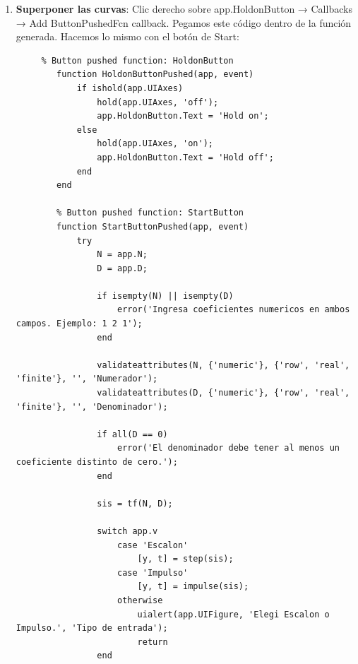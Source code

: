 \begin{enumerate}
\begin{lstlisting}
        % Value changed function: denEditField
        function denEditFieldValueChanged(app, event)
            app.D = str2num(app.denEditField.Value, Evaluation="restricted");
            disp(app.D)
        end

        % Value changed function: DropDown
        function DropDownValueChanged(app, event)
            app.v = app.DropDown.Value;
            
        end
    \end{lstlisting}
    
    \item \textbf{Superponer las curvas}: Clic derecho sobre app.HoldonButton → Callbacks → Add ButtonPushedFcn callback. Pegamos este código dentro de la función generada. Hacemos lo mismo con el botón de Start:
    
    \begin{lstlisting}
     % Button pushed function: HoldonButton
        function HoldonButtonPushed(app, event)
            if ishold(app.UIAxes)
                hold(app.UIAxes, 'off');
                app.HoldonButton.Text = 'Hold on';
            else
                hold(app.UIAxes, 'on');
                app.HoldonButton.Text = 'Hold off';
            end
        end

        % Button pushed function: StartButton
        function StartButtonPushed(app, event)
            try
                N = app.N;
                D = app.D;

                if isempty(N) || isempty(D)
                    error('Ingresa coeficientes numericos en ambos campos. Ejemplo: 1 2 1');
                end

                validateattributes(N, {'numeric'}, {'row', 'real', 'finite'}, '', 'Numerador');
                validateattributes(D, {'numeric'}, {'row', 'real', 'finite'}, '', 'Denominador');

                if all(D == 0)
                    error('El denominador debe tener al menos un coeficiente distinto de cero.');
                end

                sis = tf(N, D);

                switch app.v
                    case 'Escalon'
                        [y, t] = step(sis);
                    case 'Impulso'
                        [y, t] = impulse(sis);
                    otherwise
                        uialert(app.UIFigure, 'Elegi Escalon o Impulso.', 'Tipo de entrada');
                        return
                end


\end{lstlisting}
\end{enumerate}

